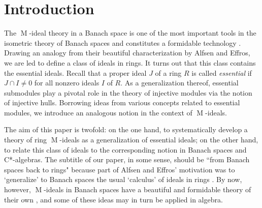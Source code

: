 \documentclass[11pt,leqno]{amsart}
\DeclareMathOperator{\m}{M}
\theoremstyle{definition}
\theoremstyle{remark}
\numberwithin{equation}{section}
\numberwithin{equation}{section}
\begin{document}
\tableofcontents	
\section{Introduction}
The $\m$-ideal  theory  in a Banach space  is one of the most important tools in the isometric theory of Banach spaces and 
constitutes a formidable technology \cite{HWW93}. 
Drawing an analogy from their beautiful characterization by Alfsen and Effros, we are led to define a class of ideals in rings.   It turns out that this class contains the essential ideals.  
Recall that a proper ideal $J$ of a ring $R$ is called \emph{essential} if $J\cap I\neq 0$ for all nonzero ideals $I$ of $R$. As a generalization thereof, essential submodules play a pivotal role in the theory of injective modules via the notion of injective hulls. Borrowing ideas from various concepts related to essential modules, we introduce an analogous notion in the context of $\m$-ideals.

The aim of this paper is twofold: on the one hand, to systematically develop a theory of ring $\m$-ideals as a generalization of essential ideals; on the other hand, to relate this class of ideals to the corresponding notion in Banach spaces and C*-algebras.  The subtitle of our paper, in some sense, should be ``from Banach spaces back to rings" because part of
Alfsen and Effros' motivation was to `generalize' to Banach spaces the usual `calculus' of ideals in rings \cite{Lam01,Row88}.  By now, however, $\m$-ideals in Banach spaces have a beautiful and formidable theory of their own \cite{HWW93}, and some of these ideas may in turn be applied in algebra. 
\end{document}
